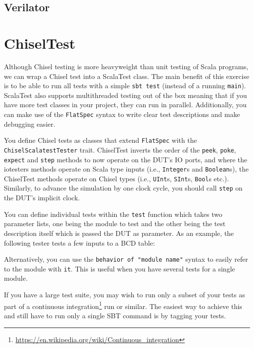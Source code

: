 \documentclass[%
    10pt,
    headinclude, footexclude,
    openright, %
    notitlepage,
    cleardoubleempty,
    headsepline,
    pointlessnumbers,
    bibtotoc, idxtotoc,
    ]{scrbook}
\newcommand{\code}[1]{{\small{\texttt{#1}}}}
\newcommand{\myref}[2]{\href{#1}{#2}}
\renewcommand{\myref}[2]{{#2}{\footnote{\url{#1}}}}
\begin{document}
\subsection{Verilator}






\section{ChiselTest}


\noindent Although Chisel testing is more heavyweight than unit testing of Scala programs,
we can wrap a Chisel test into a ScalaTest class. The main benefit of this exercise is to 
be able to run all tests with a simple \code{sbt test} (instead of a running \code{main}). 
ScalaTest also supports multithreaded testing out of the box meaning that if you have more 
test classes in your project, they can run in parallel. Additionally, you can make use of 
the \code{FlatSpec} syntax to write clear test descriptions and make debugging easier.

\noindent You define Chisel tests as classes that extend \code{FlatSpec} with 
the \code{ChiselScalatestTester} trait. ChiselTest inverts the order of the \code{peek}, 
\code{poke}, \code{expect} and \code{step} methods to now operate on the DUT's IO ports, 
and where the iotesters methods operate on Scala type inputs (i.e., \code{Integer}s and 
\code{Boolean}s), the ChiselTest methods operate on Chisel types (i.e., \code{UInt}s, 
\code{SInt}s, \code{Bool}s etc.). Similarly, to advance the simulation by one clock cycle, 
you should call \code{step} on the DUT's implicit clock.

You can define individual tests within the \code{test} function which takes two parameter 
lists, one being the module to test and the other being the test description itself which 
is passed the DUT as parameter. As an example, the following tester tests a few inputs to 
a BCD table:


\noindent Alternatively, you can use the \code{behavior of "module name"} syntax to easily 
refer to the module with \code{it}. This is useful when you have several tests for a 
single module.


\noindent If you have a large test suite, you may wish to run only a subset of your tests 
as part of a \myref{https://en.wikipedia.org/wiki/Continuous_integration}{continuous integration} 
run or similar. The easiest way to achieve this and still have to run only a single SBT command 
is by tagging your tests.
\end{document}
